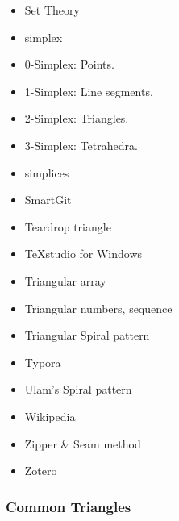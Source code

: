 \documentclass[12pt]{article}
\begin{document}
\begin{itemize}
        \item Set Theory
        \item simplex
        \item 0-Simplex: Points.
        \item 1-Simplex: Line segments.
        
        \item 2-Simplex: Triangles.
        \item 3-Simplex: Tetrahedra.
        \item simplices
        \item SmartGit
        
        \item Teardrop triangle
        \item TeXstudio for Windows
        \item Triangular array
        \item Triangular numbers, sequence
        
        \item Triangular Spiral pattern
        \item Typora
        \item Ulam's Spiral pattern
        \item Wikipedia
        
        \item Zipper \& Seam method
        \item Zotero
    \end{itemize}
        
        \subsubsection{Common Triangles}
        \label{secb:24}
        
\end{document}
